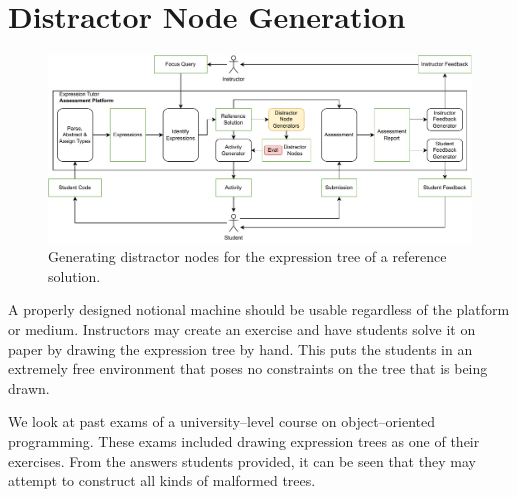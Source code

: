 \chapter{Distractor Node Generation}\label{sec:dn}

\begin{chapterBody}

\begin{figure}[ht]
    \centering
    \includegraphics[width=\textwidth]{res/5/et_loop_distractors.pdf}
    \caption{Generating distractor nodes for the expression tree of a reference
solution.}
    \label{fig:dn-intro-loop}
\end{figure}

A properly designed notional machine should be usable regardless of the
platform or medium. Instructors may create an exercise and have students solve
it on paper by drawing the expression tree by hand. This puts the students in
an extremely free environment that poses no constraints on the tree that is
being drawn.

We look at past exams of a university–level course on object–oriented
programming. These exams included drawing expression trees as one of their
exercises. 
From the answers students provided, it can be seen that they may attempt to
construct all kinds of malformed trees.


\end{chapterBody}
